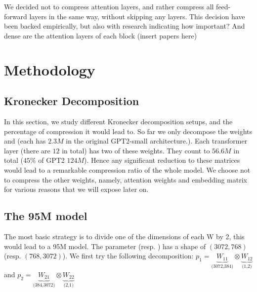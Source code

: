 \documentclass{article}
\begin{document}
We decided not to compress attention layers, and rather compress all feed-forward layers in the same way, without skipping any layers. This decision have been backed empirically, but also with research indicating how important? And dense are the attention layers of each block (insert papers here)








\section{Methodology}%
\label{sec:Training setups}

\subsection{Kronecker Decomposition}%
\label{sub:Kronecker Decomposition}

In this section, we study different Kronecker decomposition setups, and the percentage of compression it would  lead to. So far we only decompose the weights  and  (each has $2.3M$ in the original GPT2-small architecture.). Each transformer layer (there are $12$ in total) has two of these weights. They count to $56.6M$ in total ($45\%$ of GPT2 $124M$). Hence any significant reduction to these matrices would lead to a remarkable compression ratio of the whole model. We choose not to compress the other weights, namely, attention weights and embedding matrix for various reasons that we will expose later on. 

\subsection{The 95M model}%
\label{sub:The 95M model}
The most basic strategy is to divide one of the dimensions of each W by 2, this would lead to a 95M model. The parameter  (resp. ) has a shape of $(3072, 768)$ (resp.  $(768, 3072)$). We first try the following decomposition: $p_1 = \underbrace{W_{11}}_{\text{(3072,384)}} \otimes \underbrace{W_{12}}_{\text{(1,2)}}$  and $p_2 = \underbrace{W_{21}}_{\text{(384,3072)}} \otimes \underbrace{W_{22}}_{\text{(2,1)}}$  
\end{document}
